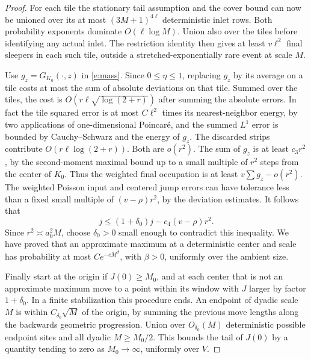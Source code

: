 \documentclass[11pt]{amsart}
\newcommand{\1}{\mathbf 1}
\begin{document}
\begin{proof}
For each tile the stationary tail assumption and the cover bound can now be unioned over its at most \((3M+1)^{4\ell}\) deterministic inlet rows. Both probability exponents dominate \(O(\ell\log M)\). Union also over the tiles before identifying any actual inlet. The restriction identity then gives at least \(v\ell^2\) final sleepers in each such tile, outside a stretched-exponentially rare event at scale \(M\).

Use \(g_z=G_{K_0}(\cdot,z)\) in \eqref{e:mass}. Since \(0\le\eta\le1\), replacing \(g_z\) by its average on a tile costs at most the sum of absolute deviations on that tile. Summed over the tiles, the cost is \(O(r\ell\sqrt{\log(2+r)})\) after summing the absolute errors. In fact the tile squared error is at most \(C\ell^2\) times its nearest-neighbor energy, by two applications of one-dimensional Poincaré, and the summed \(L^1\) error is bounded by Cauchy--Schwarz and the energy of \(g_z\). The discarded strips contribute \(O(r\ell\log(2+r))\). Both are \(o(r^2)\). The sum of \(g_z\) is at least \(c_3r^2\), by the second-moment maximal bound up to a small multiple of \(r^2\) steps from the center of \(K_0\). Thus the weighted final occupation is at least \(v\sum g_z-o(r^2)\). The weighted Poisson input and centered jump errors can have tolerance less than a fixed small multiple of \((v-\rho)r^2\), by the deviation estimates. It follows that
\[
 j\le (1+\delta_0)j-c_4(v-\rho)r^2.
\]
Since \(r^2\asymp a_0^2M\), choose \(\delta_0>0\) small enough to contradict this inequality. We have proved that an approximate maximum at a deterministic center and scale has probability at most \(C e^{-c M^\beta}\), with \(\beta>0\), uniformly over the ambient size.

Finally start at the origin if \(J(0)\ge M_0\), and at each center that is not an approximate maximum move to a point within its window with \(J\) larger by factor \(1+\delta_0\). In a finite stabilization this procedure ends. An endpoint of dyadic scale \(M\) is within \(C_{\delta_0}\sqrt M\) of the origin, by summing the previous move lengths along the backwards geometric progression. Union over \(O_{\delta_0}(M)\) deterministic possible endpoint sites and all dyadic \(M\ge M_0/2\). This bounds the tail of \(J(0)\) by a quantity tending to zero as \(M_0\to\infty\), uniformly over \(V\).


\end{proof}
\end{document}
